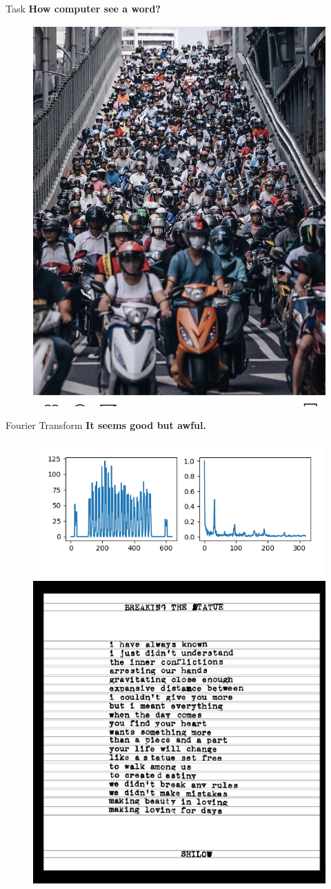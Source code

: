 \documentclass{beamer}
\begin{document}
\begin{frame}{Task}
		\textbf{How computer see a word?}
		\begin{figure}[h]
			\centering
			\includegraphics[width=0.55\linewidth]{./motor.jpg}
		\end{figure}
\end{frame}

\begin{frame}{Fourier Transform}
		\textbf{It seems good but awful.}
		\begin{figure}[H]
			\includegraphics[width=0.45\linewidth]{./fourier.png}
			\includegraphics[width=0.55\linewidth]{./imgslice.png}
		\end{figure}
\end{frame}
\end{document}
